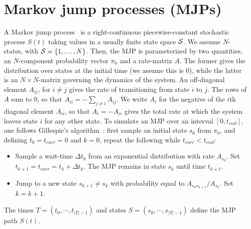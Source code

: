 \section{Markov jump processes (MJPs)} 
A Markov jump process~\citep{Cinlar1975} is a right-continuous 
piecewise-constant stochastic process $S(t)$ taking values in a 
usually finite state space ${\mathcal S}$. %
We assume $N$-states, with ${\mathcal S} = \{1,\ldots,N\}$. Then, 
the MJP is parameterized by two quantities, an $N$-component probability vector 
$\pi_0$ and a rate-matrix $A$. The former gives the distribution over states at 
the initial time (we assume this is $0$), while 
the latter is an $N \times N$-matrix governing the dynamics of the system.  An 
off-diagonal element $A_{ij}$, for $i \neq j$ gives the rate 
of transitioning from state $i$ to $j$. 
The rows of $A$ sum to $0$, so that $A_{ii}=-\sum_{j \neq i} A_{ij}  $. 
We write $A_i$ for the negative of the $i$th diagonal element $A_{ii}$, 
so that $A_i = -A_{ii}$ gives the total rate at which the system leaves state $i$ for any other state.
To simulate an MJP over an interval $[0,t_{end}]$, one follows 
Gillespie's algorithm~\citep{gillespie97}: 
first sample an initial state $s_0$ from $\pi_0$, and
defining $t_0 = t_{curr} = 0$ and $k = 0$, repeat the following while
$t_{curr} < t_{end}$:
\begin{itemize}
  \item Sample a wait-time $\Delta t_k$ from an exponential distribution with rate 
    $A_{s_k}$.  Set $t_{k+1} = t_{curr} = t_{k} + \Delta t_k$.
    The MJP remains in state $s_k$ until time $t_{k+1}$.
  \item Jump to a new state $s_{k+1} \neq s_k$ with 
    probability equal to $A_{s_ks_{k+1}}/A_{s_k}$. Set $k=k+1$.
\end{itemize}
The times $T=(t_0, \cdots, t_{|T| - 1})$ and states 
$S=(s_0, \cdots, s_{|T| - 1 })$ define the MJP path $S(t)$.

